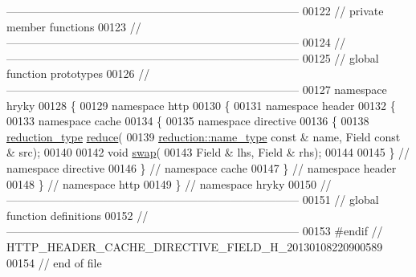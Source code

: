 \begin{DoxyCode}
{      ------------------------------------------------------------------------------}
00122 \textcolor{comment}{// private member functions}
00123 \textcolor{comment}{//
      ------------------------------------------------------------------------------}
00124 \textcolor{comment}{//
      ------------------------------------------------------------------------------}
00125 \textcolor{comment}{// global function prototypes}
00126 \textcolor{comment}{//
      ------------------------------------------------------------------------------}
00127 \textcolor{keyword}{namespace }hryky
00128 \{
00129 \textcolor{keyword}{namespace }http
00130 \{
00131 \textcolor{keyword}{namespace }header
00132 \{
00133 \textcolor{keyword}{namespace }cache
00134 \{
00135 \textcolor{keyword}{namespace }directive
00136 \{
00138     \hyperlink{namespacehryky_a343a9a4c36a586be5c2693156200eadc}{reduction_type} \hyperlink{namespacehryky_1_1http_a08fc36a78a8e2908140fcd102829a566}{reduce}(
00139         \hyperlink{namespacehryky_1_1reduction_ac686c30a4c8d196bbd0f05629a6b921f}{reduction::name_type} \textcolor{keyword}{const} & name, Field \textcolor{keyword}{const} & src);
00140 
00142     \textcolor{keywordtype}{void} \hyperlink{namespacehryky_1_1http_a38e62595ad532d18fbc65ceb61973aec}{swap}(
00143         Field & lhs, Field & rhs);
00144 
00145 \} \textcolor{comment}{// namespace directive}
00146 \} \textcolor{comment}{// namespace cache}
00147 \} \textcolor{comment}{// namespace header}
00148 \} \textcolor{comment}{// namespace http}
00149 \} \textcolor{comment}{// namespace hryky}
00150 \textcolor{comment}{//
      ------------------------------------------------------------------------------}
00151 \textcolor{comment}{// global function definitions}
00152 \textcolor{comment}{//
      ------------------------------------------------------------------------------}
00153 \textcolor{preprocessor}{#endif // HTTP\_HEADER\_CACHE\_DIRECTIVE\_FIELD\_H\_20130108220900589}
00154 \textcolor{preprocessor}{}\textcolor{comment}{// end of file}
\end{DoxyCode}
